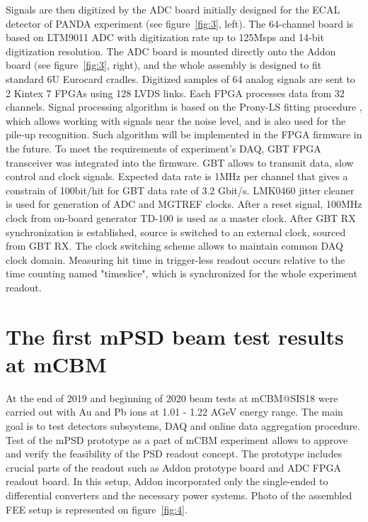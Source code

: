 \documentclass[a4paper,11pt]{article}
\begin{document}
Signals are then digitized by the ADC board initially designed for the ECAL detector of PANDA experiment \cite{4} (see figure~\ref{fig:3}, left). The 64-channel board is based on LTM9011 ADC with digitization rate up to 125Msps and 14-bit digitization resolution. The ADC board is mounted directly onto the Addon board (see figure~\ref{fig:3}, right), and the whole assembly is designed to fit standard 6U Eurocard cradles.
Digitized samples of 64 analog signals are sent to 2 Kintex 7 FPGAs using 128 LVDS links. Each FPGA processes data from 32 channels. Signal processing algorithm is based on the Prony-LS fitting procedure \cite{5}, which allows working with signals near the noise level, and is also used for the pile-up recognition. Such algorithm will be implemented in the FPGA firmware in the future.
To meet the requirements of experiment's DAQ, GBT FPGA transceiver was integrated into the firmware. GBT allows to transmit data, slow control and clock signals. Expected data rate is 1MHz per channel that gives a constrain of 100bit/hit for GBT data rate of 3.2 Gbit/s. 
LMK0460 jitter cleaner is used for generation of ADC and MGTREF clocks. After a reset signal, 100MHz clock from on-board generator TD-100 is used as a master clock. After GBT RX synchronization is established, source is switched to an external clock, sourced from GBT RX. The clock switching scheme allows to maintain common DAQ clock domain. Measuring hit time in trigger-less readout occurs relative to the time counting named "timeslice", which is synchronized for the whole experiment readout.


\section{ The first mPSD beam test results at mCBM}
At the end of 2019 and beginning of 2020 beam tests at mCBM@SIS18 were carried out with Au and Pb ions at 1.01 - 1.22 AGeV energy range. The main goal is to test detectors subsystems, DAQ and online data aggregation procedure. Test of the mPSD prototype as a part of mCBM experiment allows to approve and verify the feasibility of the PSD readout concept. The prototype includes crucial parts of the readout such as Addon prototype board and ADC FPGA readout board. In this setup, Addon incorporated only the single-ended to differential converters and the necessary power systems. Photo of the assembled FEE setup is represented on figure~\ref{fig:4}.
\end{document}
